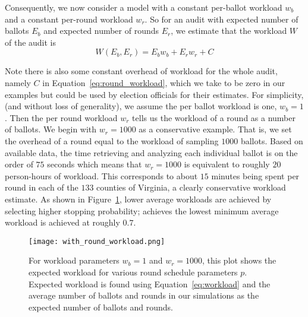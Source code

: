 Consequently, we now consider a model with a constant per-ballot workload $w_b$ and a constant per-round workload $w_r$.
So for an audit with expected number of ballots $E_{b}$ and expected number of rounds $E_{r}$, we estimate that the workload $W$ of the audit is
\begin{equation}
W(E_b,E_r) = E_b w_b + E_r w_r + C
\label{eq:round_workload}
\end{equation}

Note there is also some constant overhead of workload for the whole audit, namely $C$ in Equation~\ref{eq:round_workload}, which we take to be zero in our examples but could be used by election officials for their estimates.
For simplicity, (and without loss of generality), we assume the per ballot workload is one, $w_b=1$. Then the per round workload $w_r$ tells us the workload of a round as a number of ballots. We begin with $w_r=1000$ as a conservative example. 
That is, we set the overhead of a round equal to the workload of sampling $1000$ ballots. Based on available data\cite{RI-report}, the time retrieving and analyzing each individual ballot is on the order of $75$ seconds which means that $w_r=1000$ is equivalent to roughly $20$ person-hours of workload. This corresponds to about $15$ minutes being spent per round in each of the $133$ counties of Virginia, a clearly conservative workload estimate. 
As shown in Figure~\ref{fig:with_round_workload}, lower average workloads are achieved by selecting higher stopping probability; \Providence achieves the lowest minimum average workload is achieved at roughly $0.7$.

\begin{figure}
\texttt{[image: with\_round\_workload.png]}
\caption{For workload parameters $w_b=1$ and $w_r=1000$, this plot shows the expected workload for various round schedule parameters $p$. Expected workload is found using Equation~\ref{eq:workload} and the average number of ballots and rounds in our simulations as the expected number of ballots and rounds.}
\label{fig:with_round_workload}
\end{figure}

